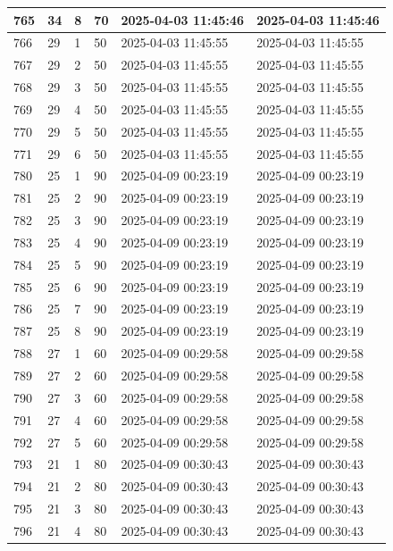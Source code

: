 \begin{longtable}{|l|l|l|l|l|l|}
765 & 34 & 8 & 70 & 2025-04-03 11:45:46 & 2025-04-03 11:45:46 \\ \hline 
766 & 29 & 1 & 50 & 2025-04-03 11:45:55 & 2025-04-03 11:45:55 \\ \hline 
767 & 29 & 2 & 50 & 2025-04-03 11:45:55 & 2025-04-03 11:45:55 \\ \hline 
768 & 29 & 3 & 50 & 2025-04-03 11:45:55 & 2025-04-03 11:45:55 \\ \hline 
769 & 29 & 4 & 50 & 2025-04-03 11:45:55 & 2025-04-03 11:45:55 \\ \hline 
770 & 29 & 5 & 50 & 2025-04-03 11:45:55 & 2025-04-03 11:45:55 \\ \hline 
771 & 29 & 6 & 50 & 2025-04-03 11:45:55 & 2025-04-03 11:45:55 \\ \hline 
780 & 25 & 1 & 90 & 2025-04-09 00:23:19 & 2025-04-09 00:23:19 \\ \hline 
781 & 25 & 2 & 90 & 2025-04-09 00:23:19 & 2025-04-09 00:23:19 \\ \hline 
782 & 25 & 3 & 90 & 2025-04-09 00:23:19 & 2025-04-09 00:23:19 \\ \hline 
783 & 25 & 4 & 90 & 2025-04-09 00:23:19 & 2025-04-09 00:23:19 \\ \hline 
784 & 25 & 5 & 90 & 2025-04-09 00:23:19 & 2025-04-09 00:23:19 \\ \hline 
785 & 25 & 6 & 90 & 2025-04-09 00:23:19 & 2025-04-09 00:23:19 \\ \hline 
786 & 25 & 7 & 90 & 2025-04-09 00:23:19 & 2025-04-09 00:23:19 \\ \hline 
787 & 25 & 8 & 90 & 2025-04-09 00:23:19 & 2025-04-09 00:23:19 \\ \hline 
788 & 27 & 1 & 60 & 2025-04-09 00:29:58 & 2025-04-09 00:29:58 \\ \hline 
789 & 27 & 2 & 60 & 2025-04-09 00:29:58 & 2025-04-09 00:29:58 \\ \hline 
790 & 27 & 3 & 60 & 2025-04-09 00:29:58 & 2025-04-09 00:29:58 \\ \hline 
791 & 27 & 4 & 60 & 2025-04-09 00:29:58 & 2025-04-09 00:29:58 \\ \hline 
792 & 27 & 5 & 60 & 2025-04-09 00:29:58 & 2025-04-09 00:29:58 \\ \hline 
793 & 21 & 1 & 80 & 2025-04-09 00:30:43 & 2025-04-09 00:30:43 \\ \hline 
794 & 21 & 2 & 80 & 2025-04-09 00:30:43 & 2025-04-09 00:30:43 \\ \hline 
795 & 21 & 3 & 80 & 2025-04-09 00:30:43 & 2025-04-09 00:30:43 \\ \hline 
796 & 21 & 4 & 80 & 2025-04-09 00:30:43 & 2025-04-09 00:30:43 \\ \hline 

\end{longtable}
